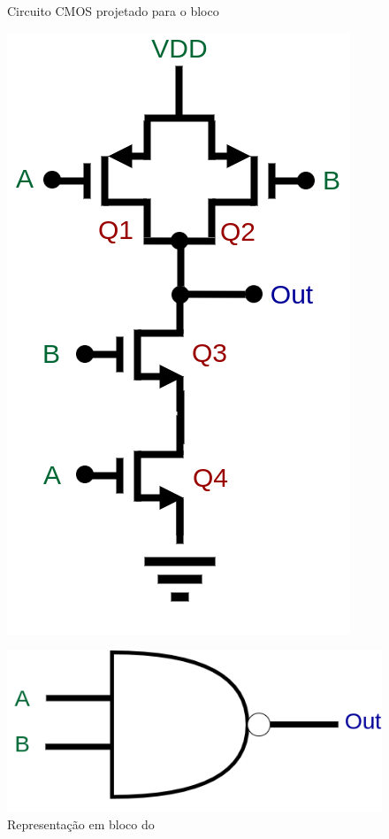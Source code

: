 \begin{figure}[htbp]
 \label{NomePFig}
 \centering
  \begin{minipage}{0.4\textwidth}
    \centering
    \caption{Circuito CMOS projetado para o bloco \NomeBloco} \label{\NomePFig}
    \includegraphics[scale=0.3]{Circuitos/NAND.png}
  \end{minipage}
  \hfill
  \begin{minipage}{0.4\textwidth}
    \centering
    \caption{Representa{\c c}\~ao em bloco do \NomeBloco} \label{NomeSFig}
    \includegraphics[scale=0.3]{Circuitos/NAND_block.png}
  \end{minipage}
\end{figure}
\clearpage